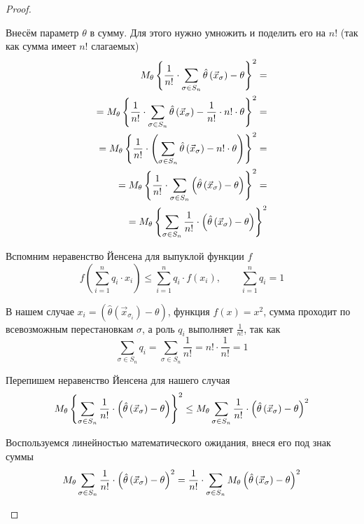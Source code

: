 \begin{proof}
\begin{enumerate}
    Внесём параметр $\theta$ в сумму.
    Для этого нужно умножить и поделить его на $n!$
    (так как сумма имеет $n!$ слагаемых)
    \begin{align*}
        M_{\theta} \left\{\frac{1}{n!}\cdot\sum_{\sigma\in S_n}
            \hat{\theta}\left(\vec{x}_\sigma\right)-\theta\right\}^2=\\
            =M_{\theta} \left\{\frac{1}{n!}\cdot\sum_{\sigma\in S_n}
                \hat{\theta}\left(\vec{x}_\sigma\right)
                -\frac{1}{n!}\cdot n!\cdot\theta\right\}^2=\\
            =M_{\theta} \left\{\frac{1}{n!}\cdot\left(\sum_{\sigma\in S_n}
                \hat{\theta}\left(\vec{x}_\sigma\right)
                -n!\cdot\theta\right)\right\}^2=\\
            =M_{\theta} \left\{\frac{1}{n!}\cdot\sum_{\sigma\in S_n}
                \left(\hat{\theta}\left(\vec{x}_\sigma\right)
                -\theta\right)\right\}^2=\\
            =M_{\theta} \left\{\sum_{\sigma\in S_n}\frac{1}{n!}\cdot
                \left(\hat{\theta}\left(\vec{x}_\sigma\right)
                -\theta\right)\right\}^2
    \end{align*}

    Вспомним неравенство Йенсена для выпуклой функции $f$
    $$f\left(\sum_{i=1}^n q_i\cdot x_i\right)
        \le \sum_{i=1}^n q_i\cdot f\left(x_i\right),\qquad\sum_{i=1}^n q_i=1$$

    В нашем случае
    $x_i=\left(\hat{\theta}\left(\vec{x}_{\sigma_i}\right)-\theta\right)$,
    функция $f\left(x\right)=x^2$,
    сумма проходит по всевозможным перестановкам $\sigma$,
    а роль $q_i$ выполняет $\frac{1}{n!}$,
    так как
        $$\sum_{\sigma\in S_n} q_i
            =\sum_{\sigma\in S_n}\frac{1}{n!}=n!\cdot\frac{1}{n!}=1$$

    Перепишем неравенство Йенсена для нашего случая
    \begin{equation}\label{eq:jensen_symmetrization}
        M_{\theta} \left\{\sum_{\sigma\in S_n}\frac{1}{n!}\cdot
            \left(\hat{\theta}\left(\vec{x}_\sigma\right)
            -\theta\right)\right\}^2
            \le M_{\theta} \sum_{\sigma\in S_n}\frac{1}{n!}\cdot
                \left(\hat{\theta}\left(\vec{x}_\sigma\right)
                -\theta\right)^2
    \end{equation}

    Воспользуемся линейностью математического ожидания, внеся его под знак суммы
    \begin{align*}
        M_{\theta} \sum_{\sigma\in S_n}\frac{1}{n!}\cdot
            \left(\hat{\theta}\left(\vec{x}_\sigma\right)
            -\theta\right)^2
        =\frac{1}{n!}\cdot\sum_{\sigma\in S_n}
            M_{\theta} \left(\hat{\theta}\left(\vec{x}_\sigma\right)
            -\theta\right)^2
    \end{align*}


\end{enumerate}
\end{proof}

